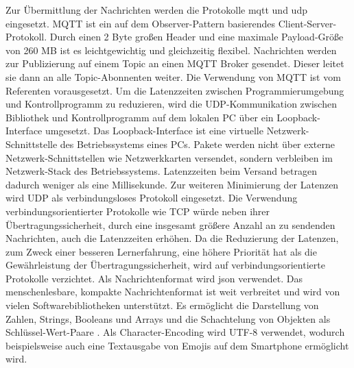 \documentclass[11pt,a4paper]{report}
\begin{document}
Zur Übermittlung der Nachrichten werden die Protokolle \acrfull{mqtt} und \acrfull{udp} eingesetzt.
MQTT ist ein auf dem Observer-Pattern basierendes Client-Server-Protokoll.
Durch einen 2 Byte großen Header und eine maximale Payload-Größe von 260 MB \cite{mqtt-size} ist es leichtgewichtig und gleichzeitig flexibel.
Nachrichten werden zur Publizierung auf einem Topic an einen MQTT Broker gesendet.
Dieser leitet sie dann an alle Topic-Abonnenten weiter.
Die Verwendung von MQTT ist vom Referenten vorausgesetzt.
Um die Latenzzeiten zwischen Programmierumgebung und Kontrollprogramm zu reduzieren, wird die UDP-Kommunikation zwischen Bibliothek und Kontrollprogramm auf dem lokalen PC über ein Loopback-Interface umgesetzt.
Das Loopback-Interface ist eine virtuelle Netzwerk-Schnittstelle des Betriebssystems eines PCs.
Pakete werden nicht über externe Netzwerk-Schnittstellen wie Netzwerkkarten versendet, sondern verbleiben im Netzwerk-Stack des Betriebssystems.
Latenzzeiten beim Versand betragen dadurch weniger als eine Millisekunde.
Zur weiteren Minimierung der Latenzen wird UDP als verbindungsloses Protokoll eingesetzt.
Die Verwendung verbindungsorientierter Protokolle wie TCP würde neben ihrer Übertragungssicherheit, durch eine insgesamt größere Anzahl an zu sendenden Nachrichten, auch die Latenzzeiten erhöhen.
Da die Reduzierung der Latenzen, zum Zweck einer besseren Lernerfahrung, eine höhere Priorität hat als die Gewährleistung der Übertragungssicherheit, wird auf verbindungsorientierte Protokolle verzichtet.
Als Nachrichtenformat wird \acrfull{json} verwendet.
Das menschenlesbare, kompakte Nachrichtenformat ist weit verbreitet und wird von vielen Softwarebibliotheken unterstützt.
Es ermöglicht die Darstellung von Zahlen, Strings, Booleans und Arrays und die Schachtelung von Objekten als Schlüssel-Wert-Paare \cite{json-rfc}.
Als Character-Encoding wird UTF-8 verwendet, wodurch beispielsweise auch eine Textausgabe von Emojis auf dem Smartphone ermöglicht wird.
\end{document}
